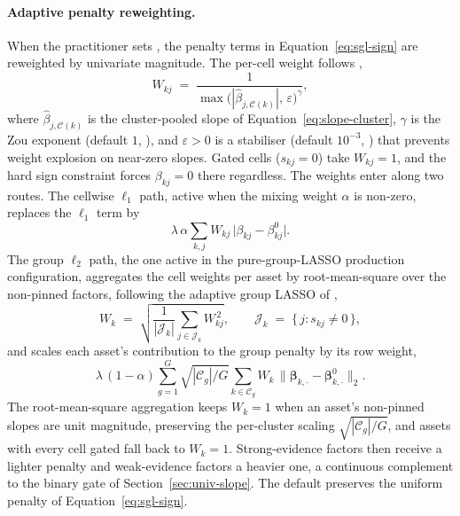 \documentclass[article]{jss}
\begin{document}
\paragraph{Adaptive penalty reweighting.}
When the practitioner sets , the
penalty terms in Equation~\ref{eq:sgl-sign} are reweighted by univariate
magnitude. The per-cell weight follows \cite{Zou:2006},
%
\begin{equation} \label{eq:adapt-cell}
W_{kj} \;=\; \frac{1}
{\max\bigl(|\hat{\beta}_{j, \mathcal{C}(k)}|,\, \varepsilon\bigr)^{\gamma}},
\end{equation}
%
where $\hat{\beta}_{j, \mathcal{C}(k)}$ is the cluster-pooled slope of
Equation~\ref{eq:slope-cluster}, $\gamma$ is the Zou exponent (default
$1$, ), and $\varepsilon > 0$ is a
stabiliser (default $10^{-3}$, ) that
prevents weight explosion on near-zero slopes. Gated cells
($s_{kj} = 0$) take $W_{kj} = 1$, and the hard sign constraint forces
$\beta_{kj} = 0$ there regardless. The weights enter along two routes.
The cellwise $\ell_1$ path, active when the mixing weight $\alpha$ is
non-zero, replaces the $\ell_1$ term by
%
\begin{equation} \label{eq:adapt-l1}
\lambda\, \alpha \sum_{k, j} W_{kj}\, \bigl| \beta_{kj} - \beta^{0}_{kj} \bigr|.
\end{equation}
%
The group $\ell_2$ path, the one active in the pure-group-LASSO
production configuration, aggregates the cell weights per asset by
root-mean-square over the non-pinned factors, following the adaptive
group LASSO of \cite{Wang+Leng:2008},
%
\begin{equation} \label{eq:adapt-row}
W_k \;=\; \sqrt{\frac{1}{|\mathcal{J}_k|} \sum_{j \in \mathcal{J}_k} W_{kj}^{\,2}},
\qquad
\mathcal{J}_k \;=\; \{\, j : s_{kj} \neq 0 \,\},
\end{equation}
%
and scales each asset's contribution to the group penalty by its row
weight,
%
\begin{equation} \label{eq:adapt-group}
\lambda\, (1 - \alpha) \sum_{g = 1}^{G} \sqrt{|\mathcal{C}_g| / G}
\sum_{k \in \mathcal{C}_g} W_k\,
\bigl\| \bm{\beta}_{k, \cdot} - \bm{\beta}^{0}_{k, \cdot} \bigr\|_2.
\end{equation}
%
The root-mean-square aggregation keeps $W_k = 1$ when an asset's
non-pinned slopes are unit magnitude, preserving the per-cluster scaling
$\sqrt{|\mathcal{C}_g| / G}$, and assets with every cell gated fall back
to $W_k = 1$. Strong-evidence factors then receive a lighter penalty and
weak-evidence factors a heavier one, a continuous complement to the
binary gate of Section~\ref{sec:univ-slope}. The default 
preserves the uniform penalty of Equation~\ref{eq:sgl-sign}.
\end{document}
